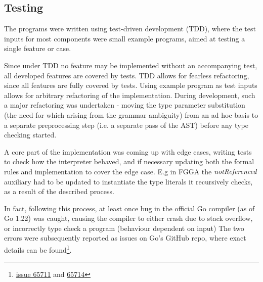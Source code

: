 

\subsection{Testing}

The programs were written using test-driven development (TDD), where the test
inputs for most components were small example programs, aimed at testing a
single feature or case.

Since under TDD no feature may be implemented without an accompanying test, all
developed features are covered by tests. TDD allows for fearless refactoring,
since all features are fully covered by tests. Using example program as test
inputs allows for arbitrary refactoring of the implementation. During
development, such a major refactoring was undertaken - moving the type parameter
substitution (the need for which arising from the grammar ambiguity) from an ad
hoc basis to a separate preprocessing step (i.e. a separate pass of the AST)
before any type checking started.

A core part of the implementation was coming up with edge cases, writing tests
to check how the interpreter behaved, and if necessary updating both the formal
rules and implementation to cover the edge case. E.g in FGGA the $\mathit{notReferenced}$
auxiliary had to be updated to instantiate the type literals it recursively
checks, as a result of the described process.


In fact, following this process, at least once bug in the official Go compiler
(as of Go 1.22) was caught, causing the compiler to either crash due to stack
overflow, or incorrectly type check a program (behaviour dependent on input)
The two errors were subsequently reported as issues on Go's GitHub repo, where
exact details can be
found\footnote{\href{https://github.com/golang/go/issues/65711}{issue 65711} and
    \href{https://github.com/golang/go/issues/65714}{65714}}.



%
